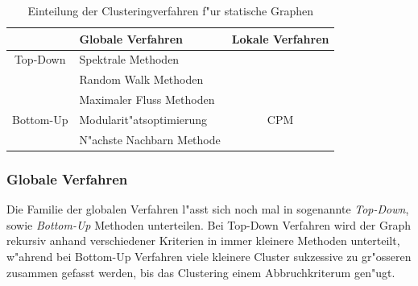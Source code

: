 \documentclass[journal]{vgtc}
\begin{document}
  
    \begin{table}[h]
    \caption{\label{tab:static_methods} Einteilung der Clusteringverfahren f"ur statische Graphen}
    \scriptsize
    \begin{center}
      \begin{tabular}{c|l|c}
	& Globale Verfahren & Lokale Verfahren\\
	\hline
	Top-Down  & Spektrale Methoden       & \\
	          & Random Walk Methoden     & \\
	          & Maximaler Fluss Methoden & \\
	\hline
	Bottom-Up & Modularit"atsoptimierung & CPM \\
	          & N"achste Nachbarn Methode & 
      \end{tabular}
    \end{center}
  \end{table}
  
  \subsubsection*{Globale Verfahren}
  Die Familie der globalen Verfahren l"asst sich noch mal in sogenannte \emph{Top-Down}, sowie
  \emph{Bottom-Up} Methoden \cite{Schaeffer} unterteilen. Bei Top-Down Verfahren wird der Graph rekursiv anhand
  verschiedener Kriterien in immer kleinere Methoden unterteilt, w"ahrend bei Bottom-Up Verfahren
  viele kleinere Cluster sukzessive zu gr"osseren zusammen gefasst werden, bis das Clustering einem
  Abbruchkriterum gen"ugt.
  
\end{document}
